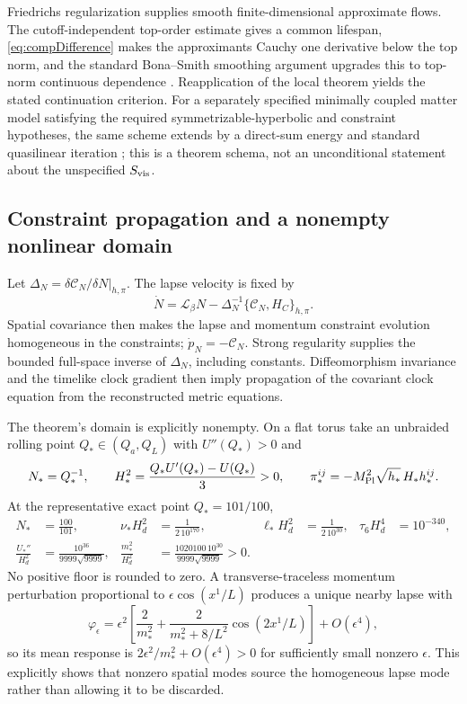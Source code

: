 \documentclass[aps,prd,reprint,onecolumn,notitlepage,nofootinbib,longbibliography,floatfix]{revtex4-2}
\theoremstyle{scstyle}
\theoremstyle{definition}
\theoremstyle{remark}
\newcommand{\mpl}{M_{\rm Pl}}
\newcommand{\cC}{\mathcal C}
\newcommand{\Lie}{\mathcal L}
\begin{document}
Friedrichs regularization supplies smooth finite-dimensional approximate flows.  The cutoff-independent top-order estimate gives a common lifespan, \cref{eq:compDifference} makes the approximants Cauchy one derivative below the top norm, and the standard Bona--Smith smoothing argument upgrades this to top-norm continuous dependence \cite{BonaSmith,IfrimTataru}.  Reapplication of the local theorem yields the stated continuation criterion.  For a separately specified minimally coupled matter model satisfying the required symmetrizable-hyperbolic and constraint hypotheses, the same scheme extends by a direct-sum energy and standard quasilinear iteration \cite{Kato}; this is a theorem schema, not an unconditional statement about the unspecified $S_{\rm vis}$.

\subsection{Constraint propagation and a nonempty nonlinear domain}
Let $\Delta_N=\delta\cC_N/\delta N|_{h,\pi}$.  The lapse velocity is fixed by
\begin{equation}
 \dot N=\Lie_\beta N-\Delta_N^{-1}\{\cC_N,H_C\}_{h,\pi}.
 \label{eq:compLapseVelocity}
\end{equation}
Spatial covariance then makes the lapse and momentum constraint evolution homogeneous in the constraints; $\dot p_N=-\cC_N$.  Strong regularity supplies the bounded full-space inverse of $\Delta_N$, including constants.  Diffeomorphism invariance and the timelike clock gradient then imply propagation of the covariant clock equation from the reconstructed metric equations.

The theorem's domain is explicitly nonempty.  On a flat torus take an unbraided rolling point $Q_*\in(Q_a,Q_L)$ with $U''(Q_*)>0$ and
\begin{equation}
 N_*=Q_*^{-1},\qquad
 H_*^2=\frac{Q_*U'(Q_*)-U(Q_*)}{3}>0,\qquad
 \pi_*^{ij}=-\mpl^2\sqrt{h_*}\,H_*h_*^{ij}.
 \label{eq:compRolling}
\end{equation}
At the representative exact point $Q_*=101/100$,
\begin{align}
 N_*&=\frac{100}{101},&
 \nu_*H_d^2&=\frac{1}{2\,10^{170}},&
 \ell_*H_d^2&=\frac{1}{2\,10^{30}},&
 \tau_6H_d^4&=10^{-340},\nonumber\\
 \frac{U_*''}{H_d^2}&=\frac{10^{36}}{9999\sqrt{9999}},&
 \frac{m_*^2}{H_d^2}&=
 \frac{1020100\,10^{30}}{9999\sqrt{9999}}>0.
 \label{eq:compRollingPoint}
\end{align}
No positive floor is rounded to zero.  A transverse-traceless momentum perturbation proportional to $\epsilon\cos(x^1/L)$ produces a unique nearby lapse with
\begin{equation}
 \varphi_\epsilon=\epsilon^2\left[
 \frac{2}{m_*^2}+\frac{2}{m_*^2+8/L^2}\cos(2x^1/L)\right]
 +O(\epsilon^4),
 \label{eq:compTTresponse}
\end{equation}
so its mean response is $2\epsilon^2/m_*^2+O(\epsilon^4)>0$ for sufficiently small nonzero $\epsilon$.  This explicitly shows that nonzero spatial modes source the homogeneous lapse mode rather than allowing it to be discarded.
\end{document}
